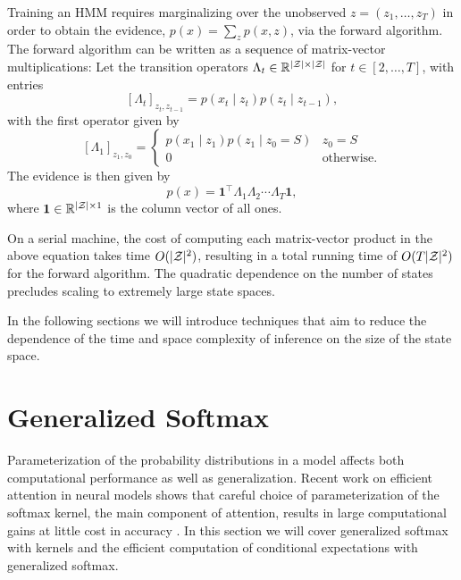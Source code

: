 \documentclass{article}
\begin{document}
Training an HMM requires marginalizing over the unobserved
$z = (z_1,\ldots,z_T)$ in order to obtain the evidence, $p(x) = \sum_z p(x,z)$,
via the forward algorithm.
The forward algorithm can be written as a sequence of matrix-vector multiplications:
Let the transition operators $\Lambda_t\in\mathbb{R}^{|\mathcal{Z}|\times|\mathcal{Z}|}$ for $t\in[2,\ldots,T]$, 
with entries $$[\Lambda_t]_{z_t,z_{t-1}} = p(x_t\mid z_t)p(z_t\mid z_{t-1}),$$
with the first operator given by
$$[\Lambda_1]_{z_1,z_0} = \begin{cases}
p(x_1 \mid z_1) p(z_1 \mid z_0=S) & z_0 = S\\
0 & \textrm{otherwise}.
\end{cases}
$$
The evidence is then given by
\begin{equation}
p(x) = \mathbf{1}^\top\Lambda_1\Lambda_2\cdots\Lambda_T\mathbf{1},
\end{equation}
where $\mathbf{1}\in\mathbb{R}^{|\mathcal{Z}|\times1}$ is the column vector of all ones.

On a serial machine, the cost of computing each matrix-vector product in
the above equation takes time $O(|\mathcal{Z}|^2)$, resulting in a total
running time of $O(T|\mathcal{Z}|^2)$ for the forward algorithm.
The quadratic dependence on the number of states precludes
scaling to extremely large state spaces.

In the following sections we will introduce techniques that
aim to reduce the dependence of the time and space complexity
of inference on the size of the state space.

\section{Generalized Softmax}
Parameterization of the probability distributions in a model affects both
computational performance as well as generalization.
Recent work on efficient attention in neural models shows that careful choice of parameterization
of the softmax kernel, the main component of attention,
results in large computational gains at little cost in accuracy
\citep{choromanski2020performer,peng2021rfa}.
In this section we will cover generalized softmax with kernels and the
efficient computation of conditional expectations with generalized softmax.
\end{document}
